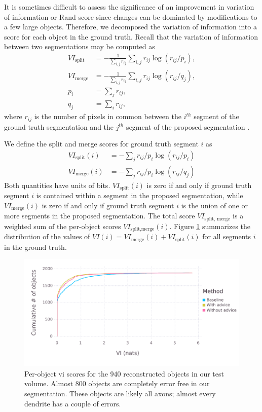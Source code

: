 \documentclass{article}
\begin{document}
It is sometimes difficult to assess the significance of an improvement in variation of information or Rand score since changes can be dominated by modifications to a few large objects. Therefore, we decomposed the variation of information into a score for each object in the ground truth. Recall that the variation of information between two segmentations may be computed as
\begin{align*}
	VI_\text{split}&=-\frac 1 {\sum_{i,j} r_{ij}} \sum_{i,j} r_{ij} \log(r_{ij}/p_i),\\
	VI_\text{merge}&=-\frac 1 {\sum_{i,j} r_{ij}} \sum_{i,j} r_{ij} \log(r_{ij}/q_j),\\
	p_i&=\sum_j r_{ij},\\
	q_j&=\sum_i r_{ij},
\end{align*}
where $r_{ij}$ is the number of pixels in common between the $i^{th}$ segment of the ground truth segmentation and the $j^{th}$ segment of the proposed segmentation \cite{vi}.

We define the split and merge scores for ground truth segment $i$ as
\begin{align*}
	VI_\text{split}(i) &= -\sum_j r_{ij}/p_i \log(r_{ij}/p_i)\\
	VI_\text{merge}(i) &= -\sum_j r_{ij}/p_i \log(r_{ij}/q_j)
\end{align*}
Both quantities have units of bits. $VI_\text{split}(i)$ is zero if and only if ground truth segment $i$ is contained within a segment in the proposed segmentation, while $VI_\text{merge}(i)$ is zero if and only if ground truth segment $i$ is the union of one or more segments in the proposed segmentation. The total score $VI_\text{split, merge}$ is a weighted sum of the per-object scores $VI_\text{split,merge}(i)$. Figure \ref{fig:decomp_vi_scores} summarizes the distribution of the values of $VI(i)=VI_\text{merge}(i)+VI_\text{split}(i)$ for all segments $i$ in the ground truth.
\begin{figure}
\begin{center}
\includegraphics[width=0.65\linewidth]{per_object_vi.pdf}
\caption{Per-object vi scores for the 940 reconstructed objects in our test volume. Almost 800 objects are completely error free in our segmentation. These objects are likely all axons; almost every dendrite has a couple of errors.}
\label{fig:decomp_vi_scores}
\end{center}
\end{figure}
\end{document}
